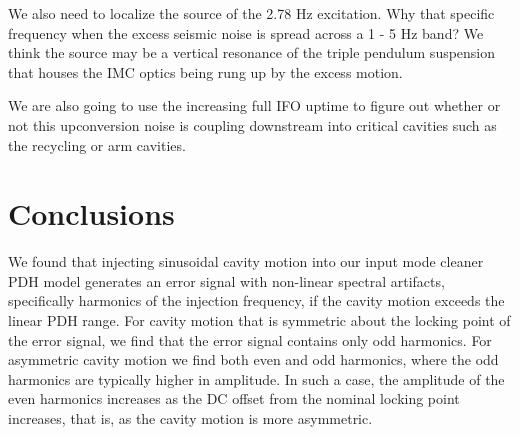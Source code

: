 We also need to localize the source of the 2.78 Hz excitation. Why that specific frequency when the excess seismic noise is spread across a 1 - 5 Hz band? We think the source may be a vertical resonance of the triple pendulum suspension that houses the IMC optics being rung up by the excess motion.

We are also going to use the increasing full IFO uptime to figure out whether or not this upconversion noise is coupling downstream into critical cavities such as the recycling or arm cavities.

\section{Conclusions}

We found that injecting sinusoidal cavity motion into our input mode cleaner PDH model generates an error signal with non-linear spectral artifacts, specifically harmonics of the injection frequency, if the cavity motion exceeds the linear PDH range. For cavity motion that is symmetric about the locking point of the error signal, we find that the error signal contains only odd harmonics. For asymmetric cavity motion we find both even and odd harmonics, where the odd harmonics are typically higher in amplitude. In such a case, the amplitude of the even harmonics increases as the DC offset from the nominal locking point increases, that is, as the cavity motion is more asymmetric.

